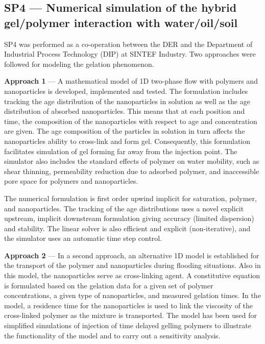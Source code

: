 \subsection*{SP4 --- Numerical simulation of the hybrid gel/polymer interaction with water/oil/soil}
%

SP4 was performed as a co-operation between the DER and the Department of Industrial Process Technology (DIP) at SINTEF Industry. Two approaches were followed for modeling the gelation phenomenon. 

\textbf{Approach 1} --- \label{ref:sp4app1} A mathematical model of 1D two-phase flow with polymers and nanoparticles is developed, implemented and tested. The formulation includes tracking the age distribution of the nanoparticles in solution as well as the age distribution of absorbed nanoparticles. This means that at each position and time, the composition of the nanoparticles with respect to age and concentration are given. The age composition of the particles in solution in turn affects the nanoparticles ability to cross-link and form gel. Consequently, this formulation facilitates simulation of gel forming far away from the injection point. The simulator also includes the standard effects of polymer on water mobility, such as shear thinning, permeability reduction due to adsorbed polymer, and inaccessible pore space for polymers and nanoparticles.

The numerical formulation is first order upwind implicit for saturation, polymer, and nanoparticles. The tracking of the age distributions uses a novel explicit upstream, implicit downstream formulation giving accuracy (limited dispersion) and stability. The linear solver is also efficient and explicit (non-iterative), and the simulator uses an automatic time step control. 

\textbf{Approach 2} --- In a second approach, an alternative 1D model is established for the transport of the polymer and nanoparticles during flooding situations. Also in this model, the nanoparticles serve as cross-linking agent. A constitutive equation is formulated based on the gelation data for a given set of polymer concentrations, a given type of nanoparticles, and measured gelation times. In the model, a residence time for the nanoparticles is used to link the viscosity of the cross-linked polymer as the mixture is transported. The model has been used for simplified simulations of injection of time delayed gelling polymers to illustrate the functionality of the model and to carry out a sensitivity analysis.

